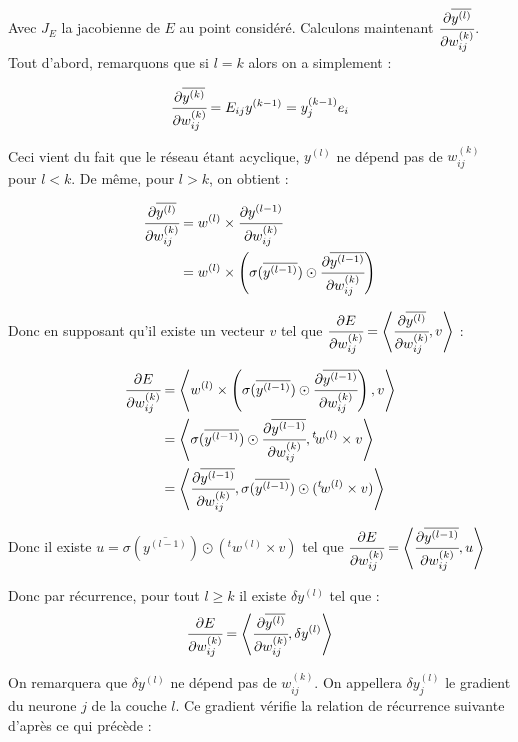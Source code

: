 Avec $J_E$ la jacobienne de $E$ au point considéré.
Calculons maintenant $\cfrac{\partial \overline{y^{(l)}}}{\partial w_{ij}^{(k)}}$.
Tout d'abord, remarquons que si $l = k$ alors on a simplement :

\[\cfrac{\partial \overline{y^{(k)}}}{\partial w_{ij}^{(k)}} = E_{ij} y^{(k-1)} = y^{(k-1)}_j e_i\]

Ceci vient du fait que le réseau étant acyclique, $ y^{(l)}$ ne dépend pas de
$w_{ij}^{(k)}$ pour $l < k$. De même, pour $l > k$, on obtient :

\begin{align*}
\cfrac{\partial \overline{y^{(l)}}}{\partial w_{ij}^{(k)}} &= w^{(l)} \times \cfrac{\partial y^{(l-1)}}{\partial w_{ij}^{(k)}}\\
&= w^{(l)} \times \left(\sigma(\overline{y^{(l-1)}}) \odot \cfrac{\partial \overline{y^{(l-1)}}}{\partial w_{ij}^{(k)}}\right)
\end{align*}

Donc en supposant qu'il existe un vecteur $v$ tel que $\cfrac{\partial E}{\partial w_{ij}^{(k)}} = \left\langle\cfrac{\partial \overline{y^{(l)}}}{\partial w_{ij}^{(k)}} ,v\right\rangle$ :

\begin{align*}
\cfrac{\partial E}{\partial w_{ij}^{(k)}} &= \left\langle w^{(l)} \times \left(\sigma(\overline{y^{(l-1)}}) \odot \cfrac{\partial \overline{y^{(l-1)}}}{\partial w_{ij}^{(k)}}\right) ,v\right\rangle\\
&= \left\langle\sigma(\overline{y^{(l-1)}}) \odot \cfrac{\partial \overline{y^{(l-1)}}}{\partial w_{ij}^{(k)}},{}^t \! w^{(l)} \times v\right\rangle\\
&= \left\langle\cfrac{\partial \overline{y^{(l-1)}}}{\partial w_{ij}^{(k)}},\sigma(\overline{y^{(l-1)}}) \odot ({}^t \! w^{(l)} \times v)\right\rangle\\
\end{align*}

Donc il existe $u = \sigma(\overline{y^{(l-1)}}) \odot ({}^t \! w^{(l)} \times v)$
tel que $\cfrac{\partial E}{\partial w_{ij}^{(k)}} = \left\langle\cfrac{\partial \overline{y^{(l-1)}}}{\partial w_{ij}^{(k)}} ,u\right\rangle$

Donc par récurrence, pour tout $l \geq k$ il existe $\delta y^{(l)}$ tel que :
\[\cfrac{\partial E}{\partial w_{ij}^{(k)}} = \left\langle\cfrac{\partial \overline{y^{(l)}}}{\partial w_{ij}^{(k)}} ,\delta y^{(l)}\right\rangle\]

On remarquera que $\delta y^{(l)}$ ne dépend pas de $w_{ij}^{(k)}$. On appellera
 $\delta y^{(l)}_j$ le gradient du neurone $j$ de la couche $l$. Ce gradient
 vérifie la relation de récurrence suivante d'après ce qui précède :


